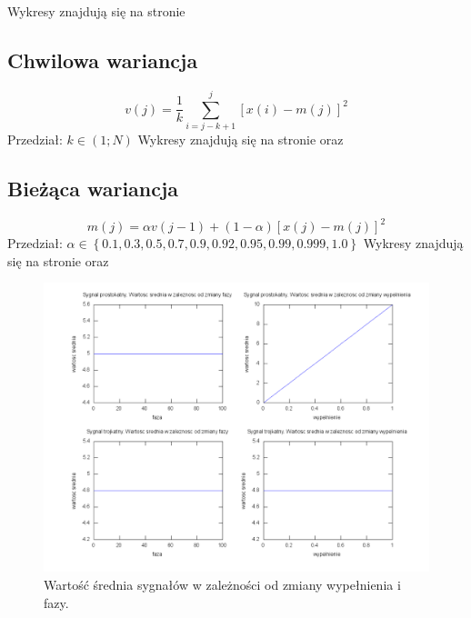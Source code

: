 \documentclass[wide,a4paper,titlepage,12pt]{mwart}
\begin{document}
      Wykresy znajdują się na stronie \pageref{wykres7}
      
    \subsection{Chwilowa wariancja}
      \begin{displaymath}
        v(j) = \frac{1}{k} \sum^{j}_{i=j-k+1} [x(i)-m(j)]^2
      \end{displaymath}
      Przedział: $k \in (1 ; N)$
      \newline
      Wykresy znajdują się na stronie \pageref{wykres8} oraz \pageref{wykres9}
      
    \subsection{Bieżąca wariancja}
      \begin{displaymath}
        m(j) = \alpha v(j-1) + (1-\alpha) [x(j) - m(j)]^2
      \end{displaymath}
      Przedział: $\alpha \in \left \{0.1, 0.3, 0.5, 0.7, 0.9, 0.92, 0.95, 0.99, 0.999, 1.0\right \}$
      \newline
      Wykresy znajdują się na stronie \pageref{wykres10} oraz \pageref{wykres11}
      
      
      \begin{landscape}
        \begin{figure}[htbp]
          \begin{center}
            \includegraphics[scale=.5]{out/Figure2.png}
            \caption{\label{wykres2}Wartość średnia sygnałów w zależności od zmiany wypełnienia i fazy.}
          \end{center}
        \end{figure}
      \end{landscape}
\end{document}

